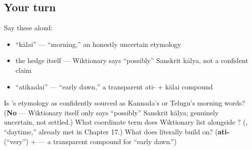 \subsection*{Your turn}
Say these aloud:

\begin{itemize}
\raggedright
  \item \textquotedblleft{}kālai\textquotedblright{} — \textquotedblleft{}morning,\textquotedblright{} an honestly uncertain etymology
  \item the hedge itself — Wiktionary says \textquotedblleft{}possibly\textquotedblright{} Sanskrit kālya, not a confident claim
  \item \textquotedblleft{}atikaalai\textquotedblright{} — \textquotedblleft{}early dawn,\textquotedblright{} a transparent ati- + kālai compound
\end{itemize}

\begin{tcolorbox}[breakable,colback=teal!4,colframe=teal!35!black,title={Before you move on}]
Is 's etymology as confidently sourced as Kannada's or Telugu's morning words? (\textbf{No} — Wiktionary itself only says \textquotedblleft{}possibly\textquotedblright{} Sanskrit kālya; genuinely uncertain, not settled.) What coordinate term does Wiktionary list alongside ? (\textbf{}, \textquotedblleft{}daytime,\textquotedblright{} already met in Chapter 17.) What does  literally build on? (\textbf{ati-} (\textquotedblleft{}very\textquotedblright{}) + \textbf{} — a transparent compound for \textquotedblleft{}early dawn.\textquotedblright{})
\end{tcolorbox}
